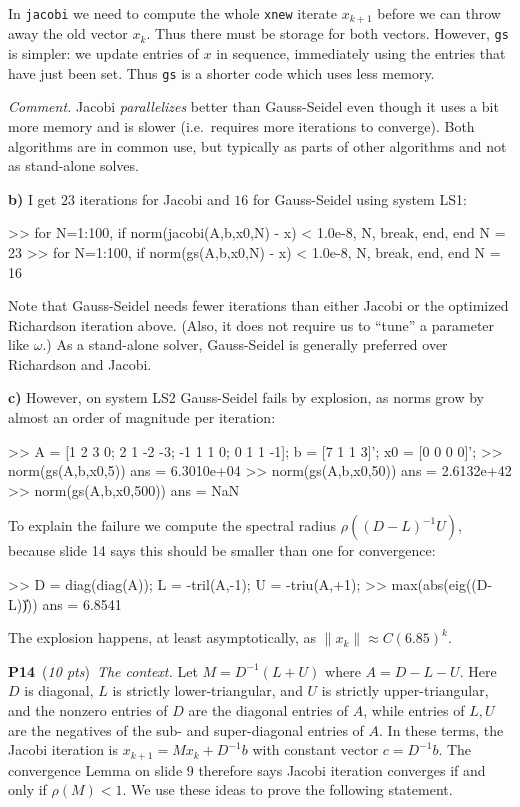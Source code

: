 \documentclass[11pt]{amsart}
\newcommand{\probpts}[2]{\bigskip\noindent\large \textbf{#1} \normalsize \,(\emph{#2})\,}
\newcommand{\epart}[1]{\medskip\noindent\textbf{#1)}}
\begin{document}
In \texttt{jacobi} we need to compute the whole \texttt{xnew} iterate $x_{k+1}$ before we can throw away the old vector $x_k$.  Thus there must be storage for both vectors.  However, \texttt{gs} is simpler: we update entries of $x$ in sequence, immediately using the entries that have just been set.  Thus \texttt{gs} is a shorter code which uses less memory.

\medskip
\noindent
\emph{Comment.}  Jacobi \emph{parallelizes} better than Gauss-Seidel even though it uses a bit more memory and is slower (i.e.~requires more iterations to converge).  Both algorithms are in common use, but typically as parts of other algorithms and not as stand-alone solves.

\clearpage\newpage
\epart{b}  I get $23$ iterations for Jacobi and $16$ for Gauss-Seidel using system LS1:
\begin{mVerb}
>> for N=1:100, if norm(jacobi(A,b,x0,N) - x) < 1.0e-8, N, break, end, end
N =                   23
>> for N=1:100, if norm(gs(A,b,x0,N) - x) < 1.0e-8, N, break, end, end
N =                   16
\end{mVerb}

Note that Gauss-Seidel needs fewer iterations than either Jacobi or the optimized Richardson iteration above.  (Also, it does not require us to ``tune'' a parameter like $\omega$.)  As a stand-alone solver, Gauss-Seidel is generally preferred over Richardson and Jacobi.

\epart{c}  However, on system LS2 Gauss-Seidel fails by explosion, as norms grow by almost an order of magnitude per iteration:
\begin{mVerb}
>> A = [1 2 3 0; 2 1 -2 -3; -1 1 1 0; 0 1 1 -1];  b = [7 1 1 3]';  x0 = [0 0 0 0]';
>> norm(gs(A,b,x0,5))
ans =    6.3010e+04
>> norm(gs(A,b,x0,50))
ans =    2.6132e+42
>> norm(gs(A,b,x0,500))
ans = NaN
\end{mVerb}

To explain the failure we compute the spectral radius $\rho((D-L)^{-1} U)$, because slide 14 says this should be smaller than one for convergence:
\begin{mVerb}
>> D = diag(diag(A));  L = -tril(A,-1);  U = -triu(A,+1);
>> max(abs(eig((D-L)\U)))
ans =  6.8541
\end{mVerb}
The explosion happens, at least asymptotically, as $\|x_k\| \approx C (6.85)^k$.


\probpts{P14}{10 pts}  \emph{The context.}  Let $M = D^{-1}(L+U)$ where $A=D-L-U$.  Here $D$ is diagonal, $L$ is strictly lower-triangular, and $U$ is strictly upper-triangular, and the nonzero entries of $D$ are the diagonal entries of $A$, while entries of $L,U$ are the negatives of the sub- and super-diagonal entries of $A$.  In these terms, the Jacobi iteration is $x_{k+1} = M x_k + D^{-1} b$ with constant vector $c=D^{-1} b$.  The convergence Lemma on slide 9 therefore says Jacobi iteration converges if and only if $\rho(M) < 1$.  We use these ideas to prove the following statement.
\end{document}
